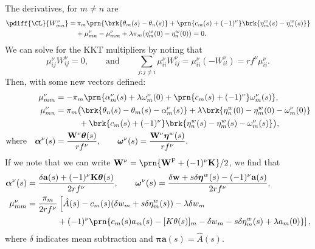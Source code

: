 \documentclass[12pt]{article}
\newcommand{\eqm}{\pi}
\newcommand{\eq}{\boldsymbol{\eqm}}
\newcommand{\etwm}{\eta^w}
\newcommand{\etw}{\boldsymbol{\eta}^w}
\newcommand{\thbm}{\theta}
\newcommand{\thb}{\boldsymbol{\thbm}}
\newcommand{\ombm}{\omega}
\newcommand{\omb}{\boldsymbol{\ombm}}
\newcommand{\albm}{\alpha}
\newcommand{\alb}{\boldsymbol{\albm}}
\newcommand{\wm}{w}
\newcommand{\w}{\mathbf{\wm}}
\newcommand{\Wm}{W}
\newcommand{\W}{\mathbf{\Wm}}
\newcommand{\encm}{K}
\newcommand{\enc}{\mathbf{\encm}}
\newcommand{\frg}{\W^{\mathrm{F}}}
\begin{document}
The derivatives, for \(m \neq n\) are
%
\begin{equation}\label{eq:finitederivs}
\begin{aligned}
  \pdiff{\CL}{\Wm^\nu_{mn}} = & \,
    \eqm_m \prn{ \brk{\thbm_m(s) - \thbm_n(s)}
     + \prn{c_m(s) + (-1)^\nu} \brk{\etwm_m(s) - \etwm_n(s)} } \\
     &+ \mu^\nu_{mn} -  \mu^\nu_{mm}
     + \lambda \eqm_m (\etwm_{m}(0)-\etwm_{n}(0)) 
    = 0.
\end{aligned}
\end{equation}
%
We can solve for the KKT multipliers by noting that
%
\begin{equation*}
  \mu^\nu_{ij} \Wm^\nu_{ij} = 0,
  \qquad \text{and} \qquad
  \sum_{j: j \neq i} \mu^\nu_{ii} \Wm^\nu_{ij} 
      = \mu^\nu_{ii} ( - \Wm^\nu_{ii}) = r f^\nu \mu^\nu_{ii}.
\end{equation*}
%
Then, with some new vectors defined:
%
\begin{equation}\label{eq:kktsol}
\begin{aligned}
  \mu^\nu_{mm} &= - \eqm_m \prn{ \albm^\nu_m(s) 
    + \lambda \ombm^\nu_m(0) 
    + \prn{{c}_m(s) + (-1)^\nu} \ombm^\nu_m(s)
    }, \\
  \mu^\nu_{mn} &= \eqm_m \big( 
      \brk{ \thbm_n(s) - \thbm_m(s) - \albm^\nu_m(s) }
    + \lambda \brk{ \etwm_n(0) - \etwm_m(0) - \ombm^\nu_m(0) } 
  \\ &\hphantom{= \eqm_m \big( }
    + \brk{{c}_m(s) + (-1)^\nu} 
        \brk{ \etwm_n(s) - \etwm_m(s) - \ombm^\nu_m(s) }
     \big), \\
  \text{where} \quad 
  \alb^\nu(s) &= \frac{\W^\nu \thb(s)}{rf^\nu}, \qquad
  \omb^\nu(s) = \frac{\W^\nu \etw(s)}{rf^\nu}.
\end{aligned}
\end{equation}
%
If we note that we can write \( \W^\nu = \prn{\frg + (-1)^\nu \enc} / 2 \), we find that
%
\begin{equation}\label{eq:diagKKT}
\begin{aligned}
  \alb^\nu(s) &= \frac{\delta\mathbf{a}(s) + (-1)^\nu \enc \thb(s)}
                     {2rf^\nu},
  \qquad 
  \omb^\nu(s) = \frac{\delta\w + s \delta\etw(s) - (-1)^\nu \mathbf{a}(s)}
                     {2rf^\nu}, 
  \\
  \mu^\nu_{mm} &= \frac{\eqm_m}{2rf^\nu} 
    \left[ 
      \hat{A}(s) - c_m(s) (\delta\wm_m + s \delta\etwm_m(s))
      - \lambda \delta w_m
    \right. \\ &\hphantom{= \frac{\eqm_m}{2f^\nu} \big[}
    \left. {}
      + (-1)^\nu \prn{ 
        c_m(s) a_m(s) - [\encm \thbm(s)]_m
        - \delta\wm_m - s \delta\etwm_m(s)
        + \lambda a_m(0)
      }
    \right], 
\end{aligned}
\end{equation}
%
where \(\delta\) indicates mean subtraction and \(\eq \mathbf{a}(s) = \hat{A}(s)\).
\end{document}
